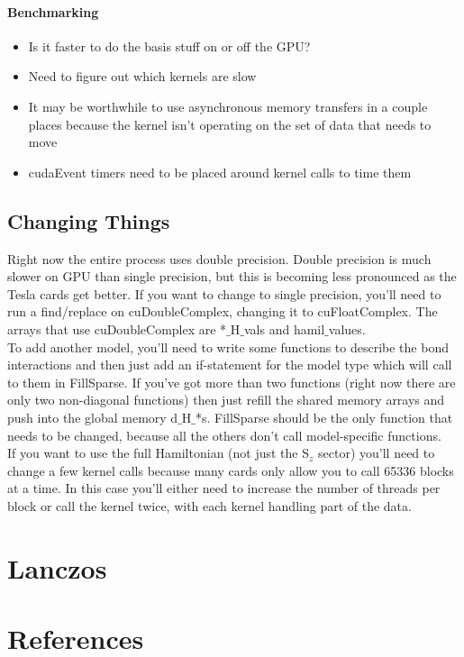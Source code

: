 \documentclass{article}
\begin{document}
\paragraph{Benchmarking}
\begin{itemize}
\item{Is it faster to do the basis stuff on or off the GPU?}
\item{Need to figure out which kernels are slow}
\item{It may be worthwhile to use asynchronous memory transfers in a couple places because the kernel isn't operating on the set of data that needs to move}
\item{cudaEvent timers need to be placed around kernel calls to time them}
\end{itemize}

\subsection{Changing Things}
Right now the entire process uses double precision. Double precision is much slower on GPU than single precision, but this is becoming less pronounced as the Tesla cards get better. If you want to change to single precision, you'll need to run a find/replace on cuDoubleComplex, changing it to cuFloatComplex. The arrays that use cuDoubleComplex are *$\_$H$\_$vals and hamil$\_$values.\\ 
To add another model, you'll need to write some functions to describe the bond interactions and then just add an if-statement for the model type which will call to them in FillSparse. If you've got more than two functions (right now there are only two non-diagonal functions) then just refill the shared memory arrays and push into the global memory d$\_$H$\_$*s. FillSparse should be the only function that needs to be changed, because all the others don't call model-specific functions.\\
If you want to use the full Hamiltonian (not just the S$_z$ sector) you'll need to change a few kernel calls because many cards only allow you to call 65336 blocks at a time. In this case you'll either need to increase the number of threads per block or call the kernel twice, with each kernel handling part of the data. 
 

\section{Lanczos}

\section{References}
\end{document}
